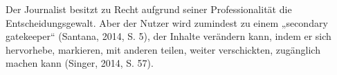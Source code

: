 Der Journalist besitzt zu Recht aufgrund seiner Professionalität die
Entscheidungsgewalt. Aber der Nutzer wird zumindest zu einem „secondary
gatekeeper“ (Santana, 2014, S. 5), der Inhalte verändern kann, indem er sich
hervorhebe, markieren, mit anderen teilen, weiter verschickten, zugänglich
machen kann (Singer, 2014, S. 57).



